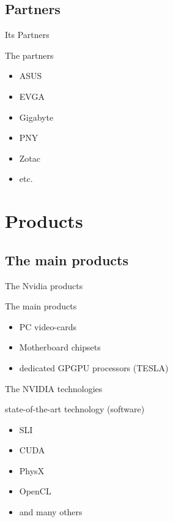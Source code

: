 \documentclass{beamer}
\begin{document}
\subsection{Partners}
\begin{frame}{Its Partners}
	\begin{block}{The partners}
		\begin{itemize}
			\item<+->{ASUS}
			\item<+->{EVGA}
			\item<+->{Gigabyte}
			\item<+->{PNY}
			\item<+->{Zotac}
			\item<+->{etc.}
		\end{itemize}
	\end{block}
\end{frame}

\section{Products}
\subsection{The main products}
\begin{frame}{The Nvidia products}
	\transdissolve[duration=0.1]
	\begin{block}{The main products}
		\begin{itemize}
			\item<+->{PC video-cards}
			\item<+->{Motherboard chipsets}
			\item<+->{dedicated GPGPU processors (TESLA)}
		\end{itemize}
	\end{block}
\end{frame}

\begin{frame}{The NVIDIA technologies}
	\transdissolve[duration=0.1]
	\begin{block}{state-of-the-art technology (software)}
		\begin{itemize}
			\item<+->{SLI}
			\item<+->{CUDA}
			\item<+->{PhysX}
			\item<+->{OpenCL}
			\item<+->{and many others}
		\end{itemize}
	\end{block}
\end{frame}
\end{document}
